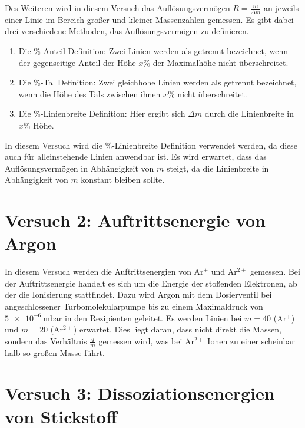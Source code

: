Des Weiteren wird in diesem Versuch das Auflösungsvermögen $R=\frac{m}{\Delta m}$ an jeweils einer Linie im Bereich großer und kleiner Massenzahlen gemessen. Es gibt dabei drei verschiedene Methoden, das Auflösungsvermögen zu definieren.
\begin{enumerate}
 \item Die \%-Anteil Definition: Zwei Linien werden als getrennt bezeichnet, wenn der gegenseitige Anteil der Höhe $x\%$ der Maximalhöhe nicht überschreitet.
 \item Die \%-Tal Definition: Zwei gleichhohe Linien werden als getrennt bezeichnet, wenn die Höhe des Tals zwischen ihnen $x\%$ nicht überschreitet.
 \item Die \%-Linienbreite Definition: Hier ergibt sich $\Delta m$ durch die Linienbreite in $x\%$ Höhe.
\end{enumerate}
In diesem Versuch wird die \%-Linienbreite Definition verwendet werden, da diese auch für alleinstehende Linien anwendbar ist. Es wird erwartet, dass das Auflösungsvermögen in Abhängigkeit von $m$ steigt, da die Linienbreite in Abhängigkeit von $m$ konstant bleiben sollte.

\section{Versuch 2: Auftrittsenergie von Argon}

In diesem Versuch werden die Auftrittsenergien von Ar$^{+}$ und Ar$^{2+}$ gemessen. Bei der Auftrittsenergie handelt es sich um die Energie der stoßenden Elektronen, ab der die Ionisierung stattfindet.
Dazu wird Argon mit dem Dosierventil bei angeschlossener Turbomolekularpumpe bis zu einem Maximaldruck von $\SI{5e-6}{\milli\bar}$ in den Rezipienten geleitet. Es werden Linien bei $m=40$ (Ar$^{+}$) und $m=20$ (Ar$^{2+}$) erwartet. Dies liegt daran, dass nicht direkt die Massen, sondern das Verhältnis $\frac{q}{m}$ gemessen wird, was bei Ar$^{2+}$ Ionen zu einer scheinbar halb so großen Masse führt.

\section{Versuch 3: Dissoziationsenergien von Stickstoff}

